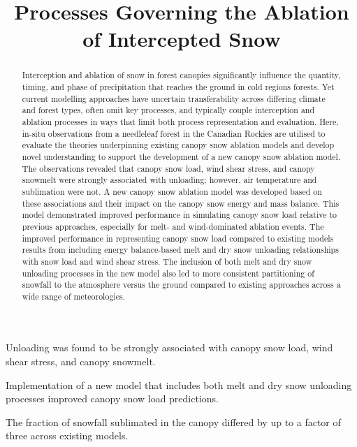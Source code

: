 \documentclass[
]{agujournal2019}
\begin{document}
\title{Processes Governing the Ablation of Intercepted Snow}


\begin{keypoints}
\item Unloading was found to be strongly associated with canopy snow
load, wind shear stress, and canopy snowmelt. \item Implementation of a
new model that includes both melt and dry snow unloading processes
improved canopy snow load predictions. \item The fraction of snowfall
sublimated in the canopy differed by up to a factor of three across
existing models. 
\end{keypoints}

\begin{abstract}
Interception and ablation of snow in forest canopies significantly
influence the quantity, timing, and phase of precipitation that reaches
the ground in cold regions forests. Yet current modelling approaches
have uncertain transferability across differing climate and forest
types, often omit key processes, and typically couple interception and
ablation processes in ways that limit both process representation and
evaluation. Here, in-situ observations from a needleleaf forest in the
Canadian Rockies are utilised to evaluate the theories underpinning
existing canopy snow ablation models and develop novel understanding to
support the development of a new canopy snow ablation model. The
observations revealed that canopy snow load, wind shear stress, and
canopy snowmelt were strongly associated with unloading; however, air
temperature and sublimation were not. A new canopy snow ablation model
was developed based on these associations and their impact on the canopy
snow energy and mass balance. This model demonstrated improved
performance in simulating canopy snow load relative to previous
approaches, especially for melt- and wind-dominated ablation events. The
improved performance in representing canopy snow load compared to
existing models results from including energy balance-based melt and dry
snow unloading relationships with snow load and wind shear stress. The
inclusion of both melt and dry snow unloading processes in the new model
also led to more consistent partitioning of snowfall to the atmosphere
versus the ground compared to existing approaches across a wide range of
meteorologies.
\end{abstract}
\end{document}
